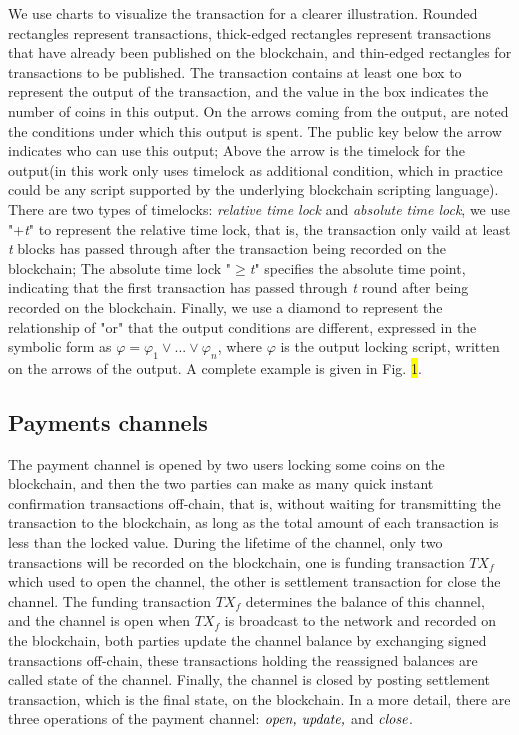 \documentclass[conference]{IEEEtran}
\begin{document}
We use charts to visualize the transaction for a clearer illustration. Rounded rectangles represent transactions, 
thick-edged rectangles represent transactions that have already been published on the blockchain, and thin-edged 
rectangles for transactions to be published. The transaction contains at least one box to represent the output 
of the transaction, and the value in the box indicates the number of coins in this output. On the arrows coming 
from the output, are noted the conditions under which this output is spent. The public key below the arrow indicates 
who can use this output; Above the arrow is the timelock for the output(in this work only uses timelock as additional 
condition, which in practice could be any script supported by the underlying blockchain scripting language). There 
are two types of timelocks: \emph{relative time lock} and \emph{absolute time lock}, we use "+\emph{t}" to represent 
the relative time lock, that is, the transaction only vaild at least \emph{t} blocks has passed through after the 
transaction being recorded on the blockchain; The absolute time lock "$\geq$\emph{t}" specifies the absolute time point, 
indicating that the first transaction has passed through \emph{t} round after being recorded on the blockchain. Finally, 
we use a diamond to represent the relationship of "or" that the output conditions are different, expressed in the symbolic 
form as $\varphi = \varphi_1 \vee ...\vee \varphi_n$, where $\varphi$ is the output locking script, written on the arrows 
of the output. A complete example is given in Fig. \colorbox{yellow}{1}.

\subsection{Payments channels}
The payment channel is opened by two users locking some coins on the blockchain, and then the two parties can make as many 
quick instant confirmation transactions off-chain, that is, without waiting for transmitting the transaction to the blockchain, 
as long as the total amount of each transaction is less than the locked value. During the lifetime of the channel, only two 
transactions will be recorded on the blockchain, one is funding transaction $TX_f$ which used to open the channel, the other is 
settlement transaction for close the channel. The funding transaction $TX_f$ determines the balance of this channel, and the 
channel is open when $TX_f$ is broadcast to the network and recorded on the blockchain, both parties update the channel balance 
by exchanging signed transactions off-chain, these transactions holding the reassigned balances are called state of the channel. 
Finally, the channel is closed by posting settlement transaction, which is the final state, on the blockchain. In a more detail, 
there are three operations of the payment channel: $\emph{open, update,}$ and  $\emph{close}$.
\end{document}
